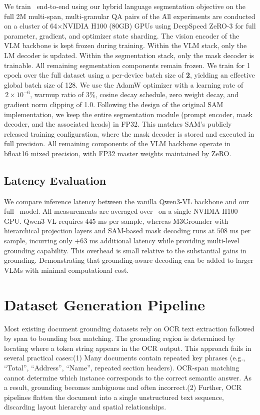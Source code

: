 We train \modelName\ end-to-end using our hybrid language segmentation
objective on the full 2M multi-span, multi-granular QA pairs of the \datasetName\. All experiments are conducted on a cluster of 64$\times$NVIDIA H100 (80GB) GPUs using DeepSpeed ZeRO-3
for full parameter, gradient, and optimizer state sharding. The vision encoder of the VLM backbone is kept
frozen during training. Within the VLM stack, only the LM decoder is updated. Within the segmentation stack, only the mask decoder is trainable. All remaining segmentation components remain frozen.
We train for 1 epoch over the full dataset using a per-device batch size of \textbf{2}, yielding an effective global batch size of 128. We use the AdamW \cite{kingma2017adammethodstochasticoptimization} optimizer with a learning rate of \(\,2\times 10^{-6}\), warmup ratio of \(3\%\), cosine decay schedule, zero weight decay, and gradient norm clipping of 1.0. Following the design of the original SAM implementation, we keep the
entire segmentation module (prompt encoder, mask decoder, and the associated heads) in FP32. This matches SAM’s publicly released training configuration, where the mask decoder is stored and executed in full precision. All remaining components of the VLM backbone operate in bfloat16 mixed precision, with FP32 master weights
maintained by ZeRO.


\subsection{Latency Evaluation}

We compare inference latency between the vanilla Qwen3-VL \cite{qwen3technicalreport} backbone and our full \modelName\ model. All measurements are averaged over \benchmarkName\  on a single NVIDIA H100 GPU. Qwen3-VL requires $445$ ms per sample, whereas M3Grounder with hierarchical projection layers and SAM-based mask decoding runs at $508$ ms per sample, incurring only $+63$ ms  additional latency while providing multi-level grounding capability. This overhead is small relative to the substantial gains in grounding. Demonstrating that grounding-aware decoding can be added to larger VLMs with minimal computational cost.

\section{Dataset Generation Pipeline}
Most existing document grounding datasets \cite{zhou2025dogr,giovannini2025boundingdocs} rely on OCR text extraction followed by span to bounding box matching. The grounding region is determined by locating where a token string appears in the OCR output.
This approach fails in several practical cases:(1) Many documents contain repeated key phrases (e.g., “Total”, “Address”, “Name”, repeated section headers).
OCR-span matching cannot determine which instance corresponds to the correct semantic answer.
As a result, grounding becomes ambiguous and often incorrect.(2) Further, OCR pipelines flatten the document into a single unstructured text sequence, discarding layout hierarchy and spatial relationships. 

